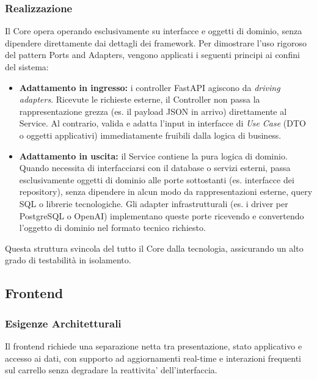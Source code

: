 \documentclass[a4paper, 11pt, oneside]{scrartcl}
\begin{document}
\subsubsection{Realizzazione}
Il Core opera operando esclusivamente su interfacce e oggetti di dominio, senza dipendere direttamente dai dettagli dei framework. Per dimostrare l'uso rigoroso del pattern Ports and Adapters, vengono applicati i seguenti principi ai confini del sistema:
\begin{itemize}
    \item \textbf{Adattamento in ingresso:} i controller FastAPI agiscono da \textit{driving adapters}. Ricevute le richieste esterne, il Controller non passa la rappresentazione grezza (es. il payload JSON in arrivo) direttamente al Service. Al contrario, valida e adatta l'input in interfacce di \textit{Use Case} (DTO o oggetti applicativi) immediatamente fruibili dalla logica di business.
    \item \textbf{Adattamento in uscita:} il Service contiene la pura logica di dominio. Quando necessita di interfacciarsi con il database o servizi esterni, passa esclusivamente oggetti di dominio alle porte sottostanti (es. interfacce dei repository), senza dipendere in alcun modo da rappresentazioni esterne, query SQL o librerie tecnologiche. Gli adapter infrastrutturali (es. i driver per PostgreSQL o OpenAI) implementano queste porte ricevendo e convertendo l'oggetto di dominio nel formato tecnico richiesto.
\end{itemize}
Questa struttura svincola del tutto il Core dalla tecnologia, assicurando un alto grado di testabilità in isolamento.

\subsection{Frontend}

\subsubsection{Esigenze Architetturali}
Il frontend richiede una separazione netta tra presentazione, stato applicativo e accesso ai dati, con supporto ad aggiornamenti real-time e interazioni frequenti sul carrello senza degradare la reattivita' dell'interfaccia.
\end{document}

